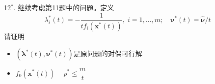 
\begin{frame}

12$^*$. 继续考虑第11题中的问题。定义
\[\lambda_i^*(t) = - \dfrac{1}{tf_i(\mathbf{x}^*(t))}, \; i = 1,\ldots,m; \quad \boldsymbol\nu^*(t) = \widehat{\boldsymbol\nu} / t\]
请证明
\begin{itemize}
\item[(1)] $(\boldsymbol\lambda^*(t), \boldsymbol\nu^*(t))$是原问题的对偶可行解
\item[(2)] $f_0(\mathbf{x}^*(t)) - p^* \le \dfrac{m}{t}$
\end{itemize}

\end{frame}












